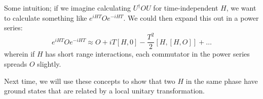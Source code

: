 Some intuition; if we imagine calculating $U^\dag O U$ for time-independent $H$, we want to calculate something like $e^{iHT}Oe^{-iHT}$. We could then expand this out in a power series:
\begin{equation}
    e^{iHT}Oe^{-iHT} \approx O + iT[H, 0] - \frac{T^2}{2}[H, [H, O]] + \ldots
\end{equation}
wherein if $H$ has short range interactions, each commutator in the power series spreads $O$ slightly.

Next time, we will use these concepts to show that two $H$ in the same phase have ground states that are related by a local unitary transformation.